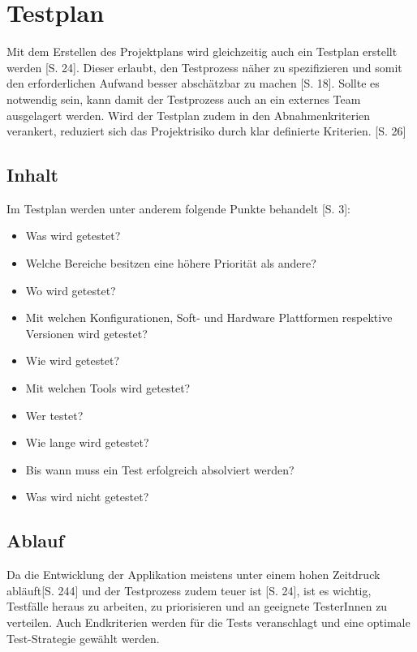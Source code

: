 \documentclass[a4paper,bibtotoc,oneside]{scrbook}
\begin{document}
\chapter{Testplan}

Mit dem Erstellen des Projektplans wird gleichzeitig auch ein Testplan erstellt werden \cite{eval_automat_webapp_test}[S. 24]. Dieser erlaubt, den Testprozess näher zu spezifizieren und somit den erforderlichen Aufwand besser abschätzbar zu machen \cite{test_large_systems}[S. 18]. Sollte es notwendig sein, kann damit der Testprozess auch an ein externes Team ausgelagert werden. Wird der Testplan zudem in den Abnahmenkriterien verankert, reduziert sich das Projektrisiko durch klar definierte Kriterien. \cite{eval_automat_webapp_test}[S. 26]

\section{Inhalt}
Im Testplan werden unter anderem folgende Punkte behandelt \cite{test_auto}[S. 3]:

\begin{itemize}
	\item Was wird getestet?
  \item Welche Bereiche besitzen eine höhere Priorität als andere?
	\item Wo wird getestet?
  \item Mit welchen Konfigurationen, Soft- und Hardware Plattformen respektive Versionen wird getestet?
	\item Wie wird getestet?
  \item Mit welchen Tools wird getestet?
	\item Wer testet?
	\item Wie lange wird getestet?
  \item Bis wann muss ein Test erfolgreich absolviert werden?
	\item Was wird nicht getestet?
\end{itemize}


\section{Ablauf}
Da die Entwicklung der Applikation meistens unter einem hohen Zeitdruck abläuft\cite{software_qual}[S. 244] und der Testprozess zudem teuer ist \cite{eval_regression}[S. 24], ist es wichtig, Testfälle heraus zu arbeiten, zu priorisieren und an geeignete TesterInnen zu verteilen. Auch Endkriterien werden für die Tests veranschlagt und eine optimale Test-Strategie gewählt werden.
\end{document}
